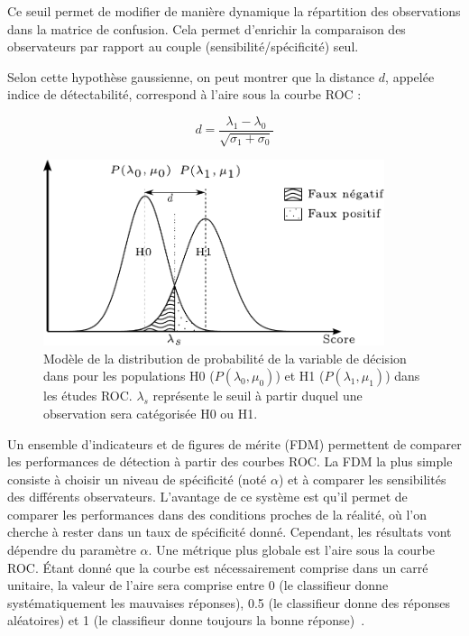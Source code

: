 Ce seuil permet de modifier de manière dynamique la répartition des observations dans la matrice de confusion.  Cela permet d'enrichir la comparaison des observateurs par rapport au couple (sensibilité/spécificité) seul.

Selon cette hypothèse gaussienne, on peut montrer que la distance $d$, appelée indice de détectabilité, correspond à l'aire sous la courbe ROC :


\begin{equation}
 d= \frac{\lambda_1 - \lambda_0}{\sqrt{\sigma_1 + \sigma_0}}
\end{equation}

\begin{figure}[h]
	\begin{center}
	\includegraphics[width=10cm]{images/loiROC}
	\vspace{-0.5cm} %
	\end{center}
	\caption[Modèle de la distribution de probabilité de la variable de décision]{Modèle de la distribution de probabilité de la variable de décision dans pour les populations H0 ($P(\lambda_0, \mu_0)$) et H1 ($P(\lambda_1, \mu_1)$) dans les études ROC. $\lambda_s$ représente le seuil à partir duquel une observation sera catégorisée H0 ou H1.}
	\label{fig:loiROC}
\end{figure}




Un ensemble d'indicateurs et de figures de mérite (FDM) permettent de comparer les performances de détection à partir des courbes ROC. La FDM la plus simple consiste à choisir un niveau de spécificité (noté $\alpha$) et à comparer les sensibilités des différents observateurs. L'avantage de ce système est qu'il permet de comparer les performances dans des conditions proches de la réalité, où l'on cherche à rester dans un taux de spécificité donné. Cependant, les résultats vont dépendre du paramètre $\alpha$. Une métrique plus globale est l'aire sous la courbe ROC. \'Etant donné que la courbe est nécessairement comprise dans un carré unitaire, la valeur de l'aire sera comprise entre 0 (le classifieur donne systématiquement les mauvaises réponses), 0.5 (le classifieur donne des réponses aléatoires) et 1 (le classifieur donne toujours la bonne réponse)~\cite{nie2006integrating}.

